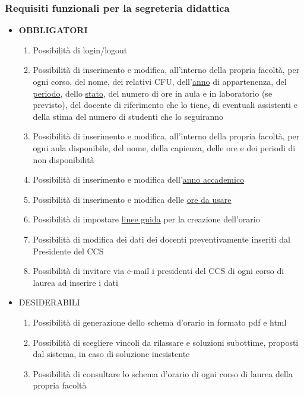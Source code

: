 \documentclass[11pt,a4paper]{article}
\begin{document}
\subsubsection{Requisiti funzionali per la segreteria didattica}
\begin{itemize}
\item \textbf{OBBLIGATORI}
\begin{enumerate}
\item Possibilità di login/logout
\item Possibilità di inserimento e modifica, all'interno della propria facoltà, per ogni corso, del nome, dei relativi CFU, dell'\underline{anno} di appartenenza, del \underline{periodo}, dello \underline{stato}, del numero di ore in aula e in laboratorio (se previsto), del docente di riferimento che lo tiene, di eventuali assistenti e della stima del numero di studenti che lo seguiranno
\item Possibilità di inserimento e modifica, all'interno della propria facoltà, per ogni aula disponibile, del nome, della capienza, delle ore e dei periodi di non disponibilità
\item Possibilità di inserimento e modifica dell'\underline{anno accademico}
\item Possibilità di inserimento e modifica delle \underline{ore da usare}
\item Possibilità di impostare \underline{linee guida} per la creazione dell'orario
\item Possibilità di modifica dei dati dei docenti preventivamente inseriti dal Presidente del CCS
\item Possibilità di invitare via e-mail i presidenti del CCS di ogni corso di laurea ad inserire i dati
\end{enumerate}
\item \textsc{DESIDERABILI}
\begin{enumerate}
\item Possibilità di generazione dello schema d'orario in formato pdf e html
\item Possibilità di scegliere vincoli da rilassare e soluzioni subottime, proposti dal sistema, in caso di soluzione inesistente
\item Possibilità di consultare lo schema d'orario di ogni corso di laurea della propria facoltà
\end{enumerate}
\end{itemize}
\end{document}
